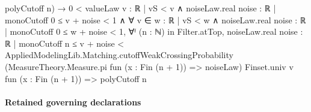 \documentclass[10pt]{article}
\begin{document}
\begin{ReviewVerbatim}
                                polyCutoff n) →
                            0 < valueLaw {v : ℝ | vS < v ∧ noiseLaw.real {noise : ℝ | monoCutoff 0 ≤ v + noise} < 1} ∧
                              ∀ v ∈ {w : ℝ | vS < w ∧ noiseLaw.real {noise : ℝ | monoCutoff 0 ≤ w + noise} < 1},
                                ∀ᶠ (n : ℕ) in Filter.atTop,
                                  noiseLaw.real {noise : ℝ | monoCutoff n ≤ v + noise} <
                                    AppliedModelingLib.Matching.cutoffWeakCrossingProbability
                                      (MeasureTheory.Measure.pi fun (x : Fin (n + 1)) => noiseLaw) Finset.univ v
                                      fun (x : Fin (n + 1)) => polyCutoff n
\end{ReviewVerbatim}

\paragraph{Retained governing declarations}
\end{document}
